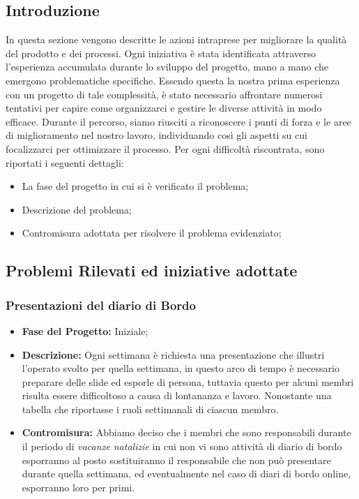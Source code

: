 \documentclass{article}
\begin{document}
\subsection{Introduzione}
In questa sezione vengono descritte le azioni intraprese per migliorare la qualità del prodotto e dei processi. 
Ogni iniziativa è stata identificata attraverso l’esperienza accumulata durante lo sviluppo del progetto, mano a mano che emergono problematiche specifiche. 
Essendo questa la nostra prima esperienza con un progetto di tale complessità, è stato necessario affrontare numerosi tentativi per capire come organizzarci e gestire le diverse attività in modo efficace. 
Durante il percorso, siamo riusciti a riconoscere i punti di forza e le aree di miglioramento nel nostro lavoro, individuando così gli aspetti su cui focalizzarci per ottimizzare il processo. 
Per ogni difficoltà riscontrata, sono riportati i seguenti dettagli:
\begin{itemize}
    \item La fase del progetto in cui si è verificato il problema;
    \item Descrizione del problema;
    \item Contromisura adottata per risolvere il problema evidenziato;
\end{itemize}

\subsection{Problemi Rilevati ed iniziative adottate}
\subsubsection{Presentazioni del diario di Bordo}
\begin{itemize}
    \item \textbf{Fase del Progetto:} Iniziale;
    \item \textbf{Descrizione:} Ogni settimana è richiesta una presentazione che illustri l'operato svolto per quella settimana, in questo arco di tempo è necessario preparare delle slide ed esporle di persona, tuttavia questo per alcuni membri risulta essere difficoltoso a causa di lontananza e lavoro. Nonostante una tabella che riportasse i ruoli settimanali di ciascun membro.
    \item \textbf{Contromisura:} Abbiamo deciso che i membri che sono responsabili durante il periodo di \textit{vacanze natalizie} in cui non vi sono attività di diario di bordo esporranno al posto sostituiranno il responsabile che non può presentare durante quella settimana, ed eventualmente nel caso di diari di bordo online, esporranno loro per primi.
\end{itemize}
\end{document}
